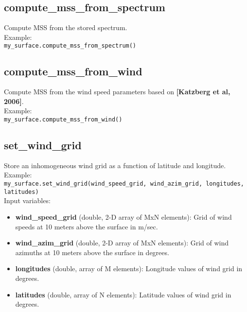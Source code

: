 \subsection{compute\_mss\_from\_spectrum}

Compute MSS from the stored spectrum.\\

Example:\\

\texttt{my\_surface.compute\_mss\_from\_spectrum()}\\


\subsection{compute\_mss\_from\_wind}

Compute MSS from the wind speed parameters based on {\bf [Katzberg et al, 2006]}.\\

Example:\\

\texttt{my\_surface.compute\_mss\_from\_wind()}\\


\subsection{set\_wind\_grid}

Store an inhomogeneous wind grid as a function of latitude and longitude.\\

Example:\\

\texttt{my\_surface.set\_wind\_grid(wind\_speed\_grid, wind\_azim\_grid, longitudes, latitudes)}\\

Input variables:
\begin{itemize}
\item {\bf wind\_speed\_grid} (double, 2-D array of MxN elements): Grid of wind speeds at 10 meters above the surface in m/sec.
\item {\bf wind\_azim\_grid} (double, 2-D array of MxN elements): Grid of wind azimuths at 10 meters above the surface in degrees.
\item {\bf longitudes} (double, array of M elements): Longitude values of wind grid in degrees.
\item {\bf latitudes} (double, array of N elements): Latitude values of wind grid in degrees.
\end{itemize}



